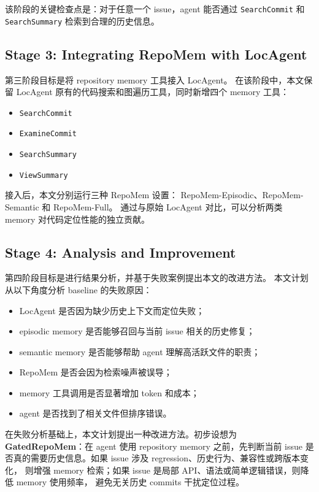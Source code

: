 该阶段的关键检查点是：对于任意一个 issue，agent 能否通过
\texttt{SearchCommit} 和 \texttt{SearchSummary} 检索到合理的历史信息。

\subsection{Stage 3: Integrating RepoMem with LocAgent}
\label{subsec:stage3}

第三阶段目标是将 repository memory 工具接入 LocAgent。
在该阶段中，本文保留 LocAgent 原有的代码搜索和图遍历工具，同时新增四个 memory 工具：

\begin{itemize}
    \item \texttt{SearchCommit}
    \item \texttt{ExamineCommit}
    \item \texttt{SearchSummary}
    \item \texttt{ViewSummary}
\end{itemize}

接入后，本文分别运行三种 RepoMem 设置：
RepoMem-Episodic、RepoMem-Semantic 和 RepoMem-Full。
通过与原始 LocAgent 对比，可以分析两类 memory 对代码定位性能的独立贡献。

\subsection{Stage 4: Analysis and Improvement}
\label{subsec:stage4}

第四阶段目标是进行结果分析，并基于失败案例提出本文的改进方法。
本文计划从以下角度分析 baseline 的失败原因：

\begin{itemize}
    \item LocAgent 是否因为缺少历史上下文而定位失败；
    \item episodic memory 是否能够召回与当前 issue 相关的历史修复；
    \item semantic memory 是否能够帮助 agent 理解高活跃文件的职责；
    \item RepoMem 是否会因为检索噪声被误导；
    \item memory 工具调用是否显著增加 token 和成本；
    \item agent 是否找到了相关文件但排序错误。
\end{itemize}

在失败分析基础上，本文计划提出一种改进方法。初步设想为
\textbf{GatedRepoMem}：在 agent 使用 repository memory 之前，先判断当前 issue
是否真的需要历史信息。如果 issue 涉及 regression、历史行为、兼容性或跨版本变化，
则增强 memory 检索；如果 issue 是局部 API、语法或简单逻辑错误，则降低 memory 使用频率，
避免无关历史 commits 干扰定位过程。

